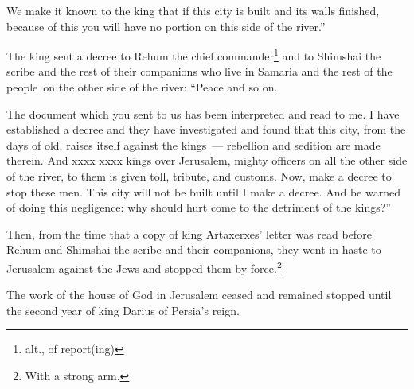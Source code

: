 \begin{inparaenum}
     We make it known to the king that if this city is built and its walls finished, because of this you will have no portion on this side of the river.''%
    
     The king sent a decree to Rehum the chief commander\footnote{alt., of report(ing)} and to Shimshai the scribe and the rest of their companions who live in Samaria and the rest of the people\understood\ on the other side of the river: ``Peace and so on.%
    
     The document which you sent to us has been interpreted and read to me.%
     I have established a decree and they have investigated and found that this city, from the days of old, raises itself against the kings~--- rebellion and sedition are made therein.%
     And xxxx xxxx kings over Jerusalem, mighty officers on all the other side of the river, to them is given toll, tribute, and customs.%
     Now, make a decree to stop these men. This city will not be built until I make a decree.%
     And be warned of doing this negligence: why should hurt come to the detriment of the kings?''%
    
     Then, from the time that a copy of king Artaxerxes' letter was read before Rehum and Shimshai the scribe and their companions, they went in haste to Jerusalem against the Jews and stopped them by force.\footnote{With a strong arm.}%
    
     The work of the house of God in Jerusalem ceased and remained stopped until the second year of king Darius of Persia's reign.%
\end{inparaenum}
